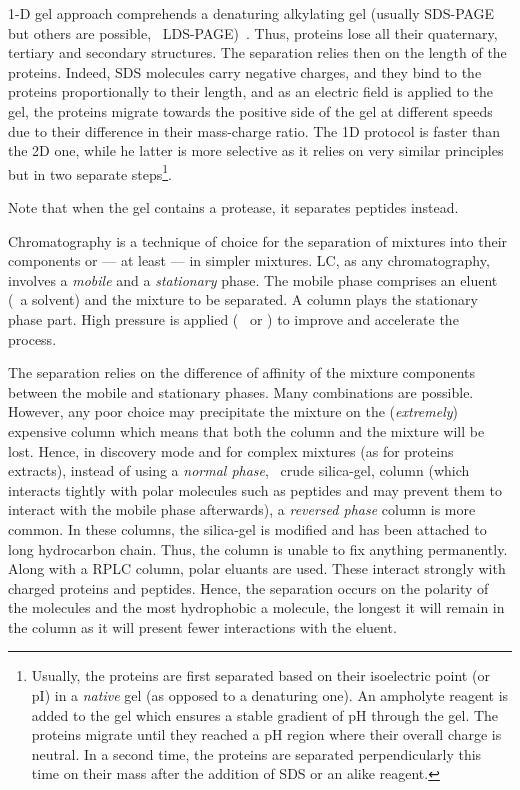1-D gel approach comprehends a denaturing alkylating gel
(usually \gls{SDS-PAGE} but others are possible,
\eg\ \gls{LDS-PAGE})~.
Thus, proteins lose all their quaternary, tertiary and secondary structures.
The separation relies then on the length of the proteins.
Indeed, \gls{SDS} molecules carry negative charges,
and they bind to the proteins proportionally to their length, and as an
electric field is applied to the gel, the proteins migrate towards the positive
side of the gel at different speeds due to their difference in their mass-charge
ratio.
The 1D protocol is faster than the 2D one, while he latter is more selective
as it relies on very similar principles but in two separate
steps\footnote{Usually, the proteins are first separated based on their
isoelectric point (or pI) in a \emph{native} gel (as opposed to a denaturing one).
An \gls{ampholyte} reagent is added to the gel which ensures a stable
gradient of \gls{pH} through the gel. The proteins migrate until they reached a
\gls{pH} region where their overall charge is neutral. In a second time, the
proteins are separated perpendicularly this time on their mass after the addition
of \gls{SDS} or an alike reagent.}.\mybr\

Note that when the gel contains a protease, it separates peptides instead.\mybr\


\vspace{-0.5mm}
Chromatography is a technique of choice for the separation of mixtures into their
components or --- at least --- in simpler mixtures. \gls{LC}, as any
chromatography, involves a \emph{mobile} and a \emph{stationary} phase.
The mobile phase comprises an eluent (\ie\ a solvent) and the mixture to be
separated. A column plays the stationary phase part.
High pressure is applied (\eg\  or )
to improve and accelerate the process.\mybr\

\vspace{-0.5mm}
The separation relies on the difference of affinity of the mixture components
between the mobile and stationary phases. Many combinations are possible. However,
any poor choice may precipitate the mixture on the (\emph{extremely})
expensive column which means that both the column and the mixture will be lost.
Hence, in discovery mode and for complex mixtures (as for proteins extracts),
instead of using a \emph{normal phase}, \ie\ crude silica-gel, column (which
interacts tightly with polar molecules such as peptides and may prevent them to
interact with the mobile phase afterwards), a \emph{reversed phase} column
is more common. In these columns, the silica-gel is modified and has been
attached to long hydrocarbon chain. Thus, the column is unable to fix anything
permanently. Along with a \gls{RPLC} column, polar eluants are used. These
interact strongly with charged proteins and peptides. Hence, the separation
occurs on the polarity of the molecules and the most hydrophobic a molecule,
the longest it will remain in the column as it will present fewer interactions
with the eluent.\mybr\

